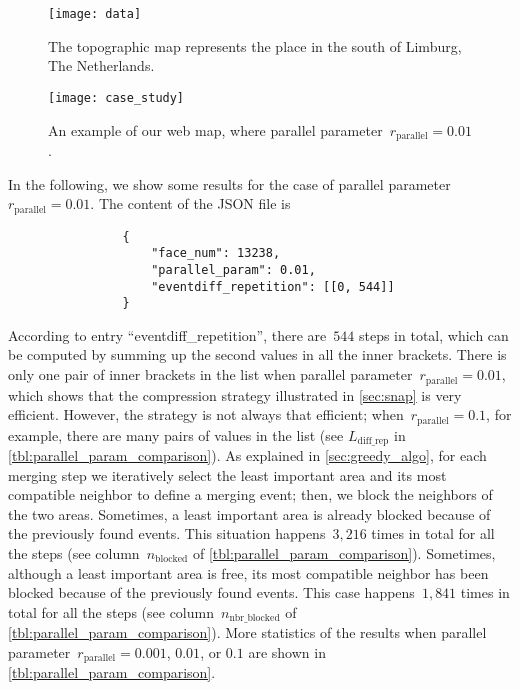 \documentclass[ijgi,article,submit,moreauthors,pdftex]{Definitions/mdpi}
\begin{document}
\begin{figure}[tb]
\centering
\texttt{[image: data]}
\caption{The topographic map represents the place 
    in the south of Limburg, The Netherlands.}
\label{fig:data}
\end{figure}


\begin{figure}[tb]
\centering
\texttt{[image: case\_study]}
\caption{An example of our web map,
    where parallel parameter~$r_\mathrm{parallel}= 0.01$.}
\label{fig:web_map}
\end{figure}



In the following, we show some results for the case of 
parallel parameter~$r_\mathrm{parallel}= 0.01$.
The content of the JSON file is 
\begin{verbatim}
                {
                    "face_num": 13238,
                    "parallel_param": 0.01,                    
                    "eventdiff_repetition": [[0, 544]]
                }
\end{verbatim}
According to entry ``eventdiff\_repetition'',
there are~$544$ steps in total, 
which can be computed by summing up the second values in all the inner brackets.
There is only one pair of inner brackets in the list
when parallel parameter~$r_\mathrm{parallel}= 0.01$,
which shows that the compression strategy illustrated in
\sect\ref{sec:snap} is very efficient.
However, the strategy is not always that efficient;
when~$r_\mathrm{parallel}= 0.1$, for example,
there are many pairs of values in the list
(see $L_\mathrm{diff\_rep}$ in \tbl\ref{tbl:parallel_param_comparison}).
%
As explained in \sect\ref{sec:greedy_algo}, 
for each merging step we iteratively select the least important area 
and its most compatible neighbor to define a merging event; 
then, we block the neighbors of the two areas.
Sometimes, a least important area is already blocked 
because of the previously found events.
This situation happens~$3{,}216$ times in total for all the steps
(see column~$n_\mathrm{blocked}$ of \tbl\ref{tbl:parallel_param_comparison}).
%
Sometimes, although a least important area is free, 
its most compatible neighbor has been blocked 
because of the previously found events.
This case happens~$1{,}841$ times in total for all the steps
(see column~$n_\mathrm{nbr\_blocked}$ of \tbl\ref{tbl:parallel_param_comparison}).
%
More statistics of the results when 
parallel parameter~$r_\mathrm{parallel}=0.001$, $0.01$, or $0.1$ 
are shown in \tbl\ref{tbl:parallel_param_comparison}.
\end{document}
